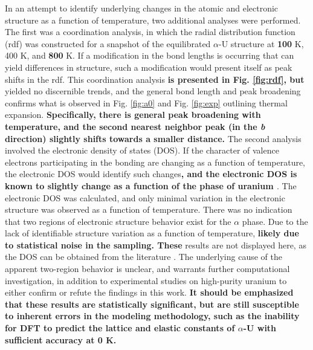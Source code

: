 \documentclass[utf8]{frontiersSCNS} %
\providecommand{\DIFaddtex}[1]{{\bf #1}} %
\providecommand{\DIFdeltex}[1]{} %
\providecommand{\DIFaddbegin}{\protect\color{blue}} %
\providecommand{\DIFaddend}{\protect\color{black}} %
\providecommand{\DIFdelbegin}{\protect\color{red}} %
\providecommand{\DIFdelend}{\protect\color{black}} %
\providecommand{\DIFadd}[1]{\texorpdfstring{\DIFaddtex{#1}}{#1}} %
\providecommand{\DIFdel}[1]{\texorpdfstring{\DIFdeltex{#1}}{}} %
\begin{document}
In an attempt to identify underlying changes in the atomic and electronic structure as a function of temperature, two additional analyses were performed. The first was a coordination analysis, in which the radial distribution function (rdf) was constructed for a snapshot of the equilibrated $\alpha$-U structure at \DIFdelbegin \DIFdel{200 }\DIFdelend \DIFaddbegin \DIFadd{100 }\DIFaddend K, 400 K, and \DIFdelbegin \DIFdel{700 }\DIFdelend \DIFaddbegin \DIFadd{800 }\DIFaddend K. If a modification in the bond lengths is occurring that can yield differences in structure, such a modification would present itself as peak shifts in the rdf. This coordination analysis \DIFaddbegin \DIFadd{is presented in Fig. \ref{fig:rdf}, but }\DIFaddend yielded no discernible trends, and the general bond length and peak broadening confirms what is observed in Fig. \ref{fig:a0} and Fig. \ref{fig:exp} outlining thermal expansion. \DIFaddbegin \DIFadd{Specifically, there is general peak broadening with temperature, and the second nearest neighbor peak (in the \textit{b} direction) slightly shifts towards a smaller distance. }\DIFaddend The second analysis involved the electronic density of states (DOS). If the character of valence electrons participating in the bonding are changing as a function of temperature, the electronic DOS would identify such changes\DIFaddbegin \DIFadd{, and the electronic DOS is known to slightly change as a function of the phase of uranium \cite{beeler2013}}\DIFaddend . The electronic DOS was calculated, and only minimal variation in the electronic structure was observed as a function of temperature. There was no indication that two regions of electronic structure behavior exist for the $\alpha$ phase. Due to the lack of identifiable structure variation as a function of temperature, \DIFdelbegin \DIFdel{these }\DIFdelend \DIFaddbegin \DIFadd{likely due to statistical noise in the sampling. These }\DIFaddend results are not displayed here, as the DOS \DIFdelbegin \DIFdel{and rdf }\DIFdelend can be obtained from the literature \cite{beeler2013,hood2008}. The underlying cause of the apparent two-region behavior is unclear, and warrants further computational investigation, in addition to experimental studies on high-purity uranium to either confirm or refute the findings in this work. \DIFaddbegin \DIFadd{It should be emphasized that these results are statistically significant, but are still susceptible to inherent errors in the modeling methodology, such as the inability for DFT to predict the lattice and elastic constants of $\alpha$-U with sufficient accuracy at 0 K. 
}\DIFaddend 
\end{document}
